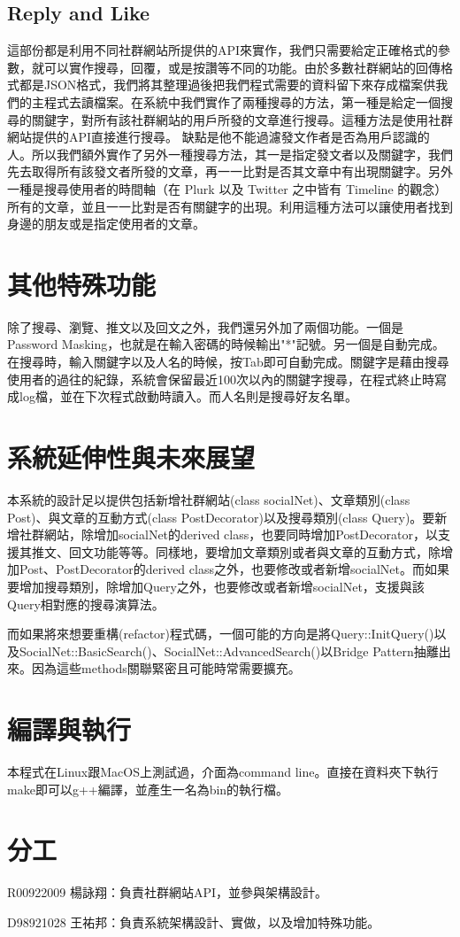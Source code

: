 \documentclass[12pt]{article}
\begin{document}
\subsection{Reply and Like}

這部份都是利用不同社群網站所提供的API來實作，我們只需要給定正確格式的參數，就可以實作搜尋，回覆，或是按讚等不同的功能。由於多數社群網站的回傳格式都是JSON格式，我們將其整理過後把我們程式需要的資料留下來存成檔案供我們的主程式去讀檔案。在系統中我們實作了兩種搜尋的方法，第一種是給定一個搜尋的關鍵字，對所有該社群網站的用戶所發的文章進行搜尋。這種方法是使用社群網站提供的API直接進行搜尋。 缺點是他不能過濾發文作者是否為用戶認識的人。所以我們額外實作了另外一種搜尋方法，其一是指定發文者以及關鍵字，我們先去取得所有該發文者所發的文章，再一一比對是否其文章中有出現關鍵字。另外一種是搜尋使用者的時間軸（在 Plurk 以及 Twitter 之中皆有 Timeline 的觀念）所有的文章，並且一一比對是否有關鍵字的出現。利用這種方法可以讓使用者找到身邊的朋友或是指定使用者的文章。

\section{其他特殊功能}
\label{sec:autocomplete}

除了搜尋、瀏覽、推文以及回文之外，我們還另外加了兩個功能。一個是Password Masking，也就是在輸入密碼的時候輸出"*"記號。另一個是自動完成。在搜尋時，輸入關鍵字以及人名的時候，按Tab即可自動完成。關鍵字是藉由搜尋使用者的過往的紀錄，系統會保留最近100次以內的關鍵字搜尋，在程式終止時寫成log檔，並在下次程式啟動時讀入。而人名則是搜尋好友名單。

\section{系統延伸性與未來展望}

本系統的設計足以提供包括新增社群網站(class socialNet)、文章類別(class Post)、與文章的互動方式(class PostDecorator)以及搜尋類別(class Query)。要新增社群網站，除增加socialNet的derived class，也要同時增加PostDecorator，以支援其推文、回文功能等等。同樣地，要增加文章類別或者與文章的互動方式，除增加Post、PostDecorator的derived class之外，也要修改或者新增socialNet。而如果要增加搜尋類別，除增加Query之外，也要修改或者新增socialNet，支援與該Query相對應的搜尋演算法。

而如果將來想要重構(refactor)程式碼，一個可能的方向是將Query::InitQuery()以及SocialNet::BasicSearch()、SocialNet::AdvancedSearch()以Bridge Pattern抽離出來。因為這些methods關聯緊密且可能時常需要擴充。

\section{編譯與執行}

本程式在Linux跟MacOS上測試過，介面為command line。直接在資料夾下執行make即可以g++編譯，並產生一名為bin的執行檔。

\section{分工}

R00922009 楊詠翔：負責社群網站API，並參與架構設計。

D98921028 王祐邦：負責系統架構設計、實做，以及增加特殊功能。
\end{document}
